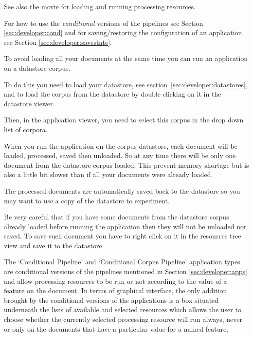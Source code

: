 See also the 
{movie for loading and running processing resources}.

For how to use the \emph{conditional} versions of the pipelines see Section
\ref{sec:developer:cond} and for saving/restoring the configuration of an
application see Section \ref{sec:developer:savestate}.



To avoid loading all your documents at the same time you can run an
application on a datastore corpus.

To do this you need to load your datastore, see
section~\ref{sec:developer:datastores}, and to load the corpus from the
datastore by double clicking on it in the datastore viewer.

Then, in the application viewer, you need to select this corpus in the drop
down list of corpora.

When you run the application on the corpus datastore, each document will be
loaded, processed, saved then unloaded. So at any time there will be only
one document from the datastore corpus loaded. This prevent memory shortage
but is also a little bit slower than if all your documents were already
loaded.

The processed documents are automatically saved back to the datastore so you
may want to use a copy of the datastore to experiment.

Be very careful that if you have some documents from the datastore corpus
already loaded before running the application then they will not be unloaded
nor saved. To save such document you have to right click on it in the
resources tree view and save it to the datastore.


The `Conditional Pipeline' and `Conditional Corpus Pipeline' application
types are conditional versions of the pipelines mentioned in Section
\ref{sec:developer:apps} and allow processing resources to be run or not according
to the value of a feature on the document. In terms of graphical interface, the
only addition brought by the conditional versions of the applications is a box
situated underneath the lists of available and selected resources which allows
the user to choose whether the currently selected processing resource will run
always, never or only on the documents that have a particular value for a named
feature.

